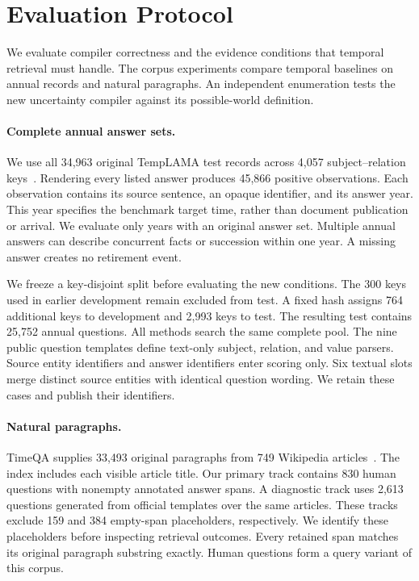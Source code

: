 \section{Evaluation Protocol}
\label{sec:protocol}

We evaluate compiler correctness and the evidence conditions that temporal retrieval must handle.
The corpus experiments compare temporal baselines on annual records and natural paragraphs.
An independent enumeration tests the new uncertainty compiler against its possible-world definition.

\paragraph{Complete annual answer sets.}
We use all 34,963 original TempLAMA test records across 4,057 subject--relation keys~\citep{dhingra2022templama}.
Rendering every listed answer produces 45,866 positive observations.
Each observation contains its source sentence, an opaque identifier, and its answer year.
This year specifies the benchmark target time, rather than document publication or arrival.
We evaluate only years with an original answer set.
Multiple annual answers can describe concurrent facts or succession within one year.
A missing answer creates no retirement event.

We freeze a key-disjoint split before evaluating the new conditions.
The 300 keys used in earlier development remain excluded from test.
A fixed hash assigns 764 additional keys to development and 2,993 keys to test.
The resulting test contains 25,752 annual questions.
All methods search the same complete pool.
The nine public question templates define text-only subject, relation, and value parsers.
Source entity identifiers and answer identifiers enter scoring only.
Six textual slots merge distinct source entities with identical question wording.
We retain these cases and publish their identifiers.

\paragraph{Natural paragraphs.}
TimeQA supplies 33,493 original paragraphs from 749 Wikipedia articles~\citep{chen2021timeqa}.
The index includes each visible article title.
Our primary track contains 830 human questions with nonempty annotated answer spans.
A diagnostic track uses 2,613 questions generated from official templates over the same articles.
These tracks exclude 159 and 384 empty-span placeholders, respectively.
We identify these placeholders before inspecting retrieval outcomes.
Every retained span matches its original paragraph substring exactly.
Human questions form a query variant of this corpus.

